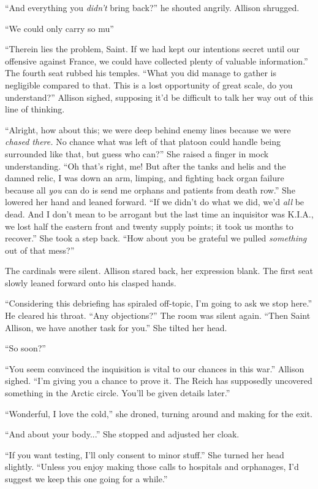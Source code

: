 \begin{Standard}
``And everything you \emph{didn't} bring back?'' he shouted angrily. Allison shrugged.

``We could only carry so mu\textemdash{}''

``Therein lies the problem, Saint. If we had kept our intentions secret until our offensive
against France, we could have collected plenty of valuable information.'' The fourth seat rubbed
his temples. ``What you did manage to gather is negligible compared to that. This is
a lost opportunity of great scale, do you understand?'' Allison sighed, supposing it'd be
difficult to talk her way out of this line of thinking.

``Alright, how about this; we were deep behind enemy lines because we were \emph{chased there.}
No chance what was left of that platoon could handle being surrounded like that, but guess who
can?'' She raised a finger in mock understanding. ``Oh that's right, me! But after the tanks
and helis and the damned relic, I was down an arm, limping, and fighting back organ failure
because all \emph{you} can do is send me orphans and patients from death row.'' She lowered her hand
and leaned forward. ``If we didn't do what we did, we'd \emph{all} be dead. And I don't mean
to be arrogant but the last time an inquisitor was K.I.A., we lost half the eastern front
and twenty supply points; it took us months to recover.'' She took a step back. ``How about
you be grateful we pulled \emph{something} out of that mess?''

The cardinals were silent. Allison stared back, her expression blank. The first seat slowly
leaned forward onto his clasped hands.

``Considering this debriefing has spiraled off-topic, I'm going to ask we stop here.'' He cleared
his throat. ``Any objections?'' The room was silent again. ``Then Saint Allison, we have
another task for you.'' She tilted her head.

``So soon?''

``You seem convinced the inquisition is vital to our chances in this war.'' Allison sighed.
``I'm giving you a chance to prove it. The Reich has supposedly uncovered something in the
Arctic circle. You'll be given details later.''

``Wonderful, I love the cold,'' she droned, turning around and making for the exit.

``And about your body...'' She stopped and adjusted her cloak.

``If you want testing, I'll only consent to minor stuff.'' She turned her head slightly.
``Unless you enjoy making those calls to hospitals and orphanages, I'd suggest
we keep this one going for a while.''


\end{Standard}
